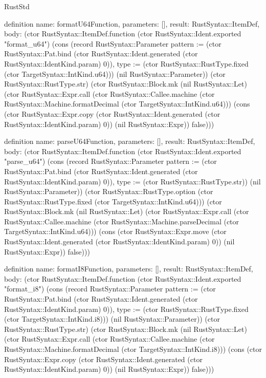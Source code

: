 \begin{lexlean}{RustStd}
\begin{semanticmodule}
definition{
  name: formatU64Function,
  parameters: [],
  result: RustSyntax::ItemDef,
  body: (ctor RustSyntax::ItemDef.function (ctor RustSyntax::Ident.exported "format_u64") (cons (record RustSyntax::Parameter {pattern := (ctor RustSyntax::Pat.bind (ctor RustSyntax::Ident.generated (ctor RustSyntax::IdentKind.param) 0)), type := (ctor RustSyntax::RustType.fixed (ctor TargetSyntax::IntKind.u64))}) (nil RustSyntax::Parameter)) (ctor RustSyntax::RustType.str) (ctor RustSyntax::Block.mk (nil RustSyntax::Let) (ctor RustSyntax::Expr.call (ctor RustSyntax::Callee.machine (ctor RustSyntax::Machine.formatDecimal (ctor TargetSyntax::IntKind.u64))) (cons (ctor RustSyntax::Expr.copy (ctor RustSyntax::Ident.generated (ctor RustSyntax::IdentKind.param) 0)) (nil RustSyntax::Expr)) false)))
}

definition{
  name: parseU64Function,
  parameters: [],
  result: RustSyntax::ItemDef,
  body: (ctor RustSyntax::ItemDef.function (ctor RustSyntax::Ident.exported "parse_u64") (cons (record RustSyntax::Parameter {pattern := (ctor RustSyntax::Pat.bind (ctor RustSyntax::Ident.generated (ctor RustSyntax::IdentKind.param) 0)), type := (ctor RustSyntax::RustType.str)}) (nil RustSyntax::Parameter)) (ctor RustSyntax::RustType.option (ctor RustSyntax::RustType.fixed (ctor TargetSyntax::IntKind.u64))) (ctor RustSyntax::Block.mk (nil RustSyntax::Let) (ctor RustSyntax::Expr.call (ctor RustSyntax::Callee.machine (ctor RustSyntax::Machine.parseDecimal (ctor TargetSyntax::IntKind.u64))) (cons (ctor RustSyntax::Expr.move (ctor RustSyntax::Ident.generated (ctor RustSyntax::IdentKind.param) 0)) (nil RustSyntax::Expr)) false)))
}

definition{
  name: formatI8Function,
  parameters: [],
  result: RustSyntax::ItemDef,
  body: (ctor RustSyntax::ItemDef.function (ctor RustSyntax::Ident.exported "format_i8") (cons (record RustSyntax::Parameter {pattern := (ctor RustSyntax::Pat.bind (ctor RustSyntax::Ident.generated (ctor RustSyntax::IdentKind.param) 0)), type := (ctor RustSyntax::RustType.fixed (ctor TargetSyntax::IntKind.i8))}) (nil RustSyntax::Parameter)) (ctor RustSyntax::RustType.str) (ctor RustSyntax::Block.mk (nil RustSyntax::Let) (ctor RustSyntax::Expr.call (ctor RustSyntax::Callee.machine (ctor RustSyntax::Machine.formatDecimal (ctor TargetSyntax::IntKind.i8))) (cons (ctor RustSyntax::Expr.copy (ctor RustSyntax::Ident.generated (ctor RustSyntax::IdentKind.param) 0)) (nil RustSyntax::Expr)) false)))
}


\end{semanticmodule}
\end{lexlean}
